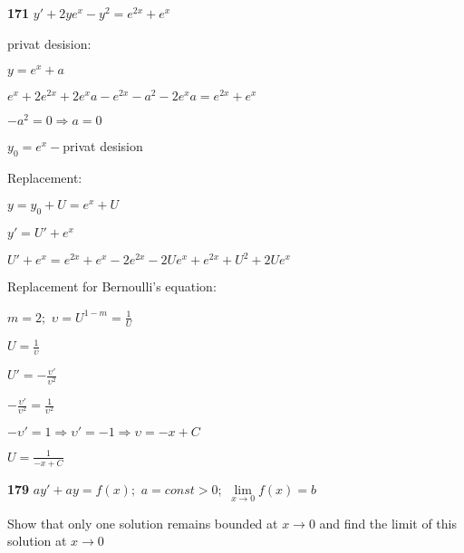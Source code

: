 \documentclass{article}
\begin{document}
\begin{flushleft}
{\bf 171 } $y'+2ye^x-y^2=e^{2x}+e^x$

\end{flushleft}
privat desision:
\begin{center}
\begin{spacing}{1.5}
$y=e^x+a$

$e^x+2e^{2x}+2e^xa-e^{2x}-a^2-2e^xa=e^{2x}+e^x$

$-a^2=0 \Rightarrow a=0$

$y_0=e^x - $privat desision
\end{spacing}
\end{center}
Replacement:
\begin{center}
\begin{spacing}{1.5}
$y=y_0+U=e^x+U$

$y'=U'+e^x$

$U'+e^x=e^{2x}+e^x-2e^{2x}-2Ue^x+e^{2x}+U^2+2Ue^x$

\end{spacing}
\end{center}
Replacement for Bernoulli's equation:
\begin{center}
\begin{spacing}{1.8}
$m=2; $ $\displaystyle \upsilon=U^{1-m}=\frac{1}{U}$

$\displaystyle U=\frac{1}{\upsilon}$

$\displaystyle U'=-\frac{\upsilon'}{\upsilon^2}$

$\displaystyle -\frac{\upsilon'}{\upsilon^2}=\frac{1}{\upsilon^2}$

$-\upsilon'=1 \Rightarrow \upsilon'=-1 \Rightarrow \upsilon=-x+C$

$\displaystyle U=\frac{1}{-x+C}$

\end{spacing}
\end{center}

\begin{flushleft}
{\bf 179 } $ay'+ay=f(x); $ $a=const>0; $ $\lim\limits_{x \to 0} f(x) = b$

\end{flushleft}
Show that only one solution remains bounded at $x \rightarrow 0$ and find the limit of this solution at $x \rightarrow 0$
\end{document}
